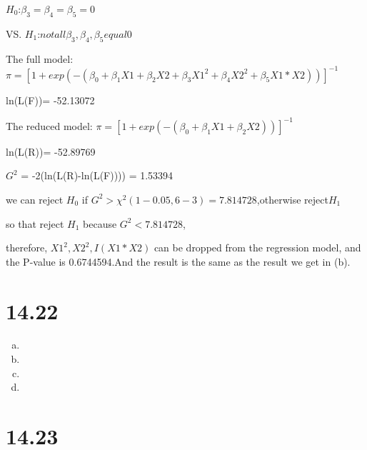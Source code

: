 \documentclass{article}\usepackage[]{graphicx}\usepackage[]{color}
\begin{document}
\begin{enumerate}[(a)]
\begin{center}
$H_0$:$\beta_3=\beta_4=\beta_5=0$

VS. $H_1$:$not all \beta_3,\beta_4,\beta_5 equal 0$

The full model: $\pi = [1 + exp(-(\beta_0 + \beta_1 X1 + \beta_2 X2 + \beta_3 X1^2 + \beta_4 X2^2 + \beta_5 X1*X2))]^{-1} $

ln(L(F))= -52.13072

The reduced model: $\pi = [1 + exp(-(\beta_0 + \beta_1 X1 + \beta_2 X2))]^{-1} $

ln(L(R))= -52.89769

$G^2$ = -2(ln(L(R)-ln(L(F)))) = 1.53394

we can reject $H_0$ if $G^2 > \chi^2(1-0.05, 6-3)=7.814728$,otherwise reject$H_1$

so that reject $H_1$ because $G^2 < 7.814728$,

therefore, $X1^2,X2^2,I(X1*X2)$ can be dropped from the regression model, and the P-value is 0.6744594.And the result is the same as the result we get in (b).
\end{center}

\end{enumerate}

\section{14.22}

\begin{enumerate}[(a)]

\item



\item

\item

\item

\end{enumerate}

\section{14.23}
\end{document}
